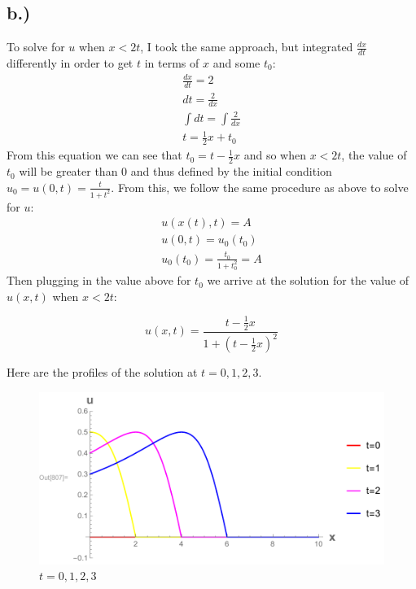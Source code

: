 \documentclass{article}
\begin{document}
\subsection*{b.)}
To solve for $u$ when $x < 2t$, I took the same approach, but integrated $\frac{dx}{dt}$ differently in order to get $t$ in terms of $x$ and some $t_0$:
\begin{equation}
\begin{aligned}
\frac{dx}{dt} = 2\\
dt = \frac{2}{dx}\\
\int dt = \int \frac{2}{dx}\\
t = \frac{1}{2}x + t_0
\end{aligned}
\end{equation}
From this equation we can see that $t_0 = t - \frac{1}{2}x$ and so when $x < 2t$, the value of $t_0$ will be greater than $0$ and thus defined by the initial condition $u_0 = u(0,t) = \frac{t}{1+t^2}$. From this, we follow the same procedure as above to solve for $u$:
\begin{equation}
\begin{aligned}
u(x(t), t) = A\\
u(0, t) = u_0(t_0)\\
u_0(t_0) = \frac{t_0}{1+t_0^2} = A
\end{aligned}
\end{equation}
Then plugging in the value above for $t_0$ we arrive at the solution for the value of $u(x, t)$ when $x < 2t$:
\begin{tcolorbox}[minipage,colback=white,arc=0pt,outer arc=0pt]
\begin{equation}
u(x, t) =  \frac{t - \frac{1}{2}x}{1+(t - \frac{1}{2}x)^2}
\end{equation}
\end{tcolorbox}
Here are the profiles of the solution at $t = 0, 1, 2, 3$.
\begin{figure}[H]
  \centering
    \includegraphics[width=\textwidth]{hw_12_plot2.pdf}
    \caption{$t = 0, 1, 2, 3$}
\end{figure}
\end{document}
